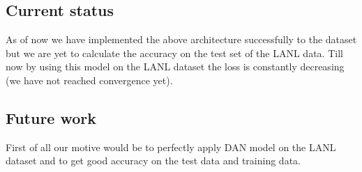 \subsection{Current status}
As of now we have implemented the above architecture successfully to the dataset but we are yet to calculate the accuracy on the test set of the LANL data. Till now by using this model on the LANL dataset the loss is constantly decreasing (we have not reached convergence yet).


\subsection{Future work}
First of all our motive would be to perfectly apply DAN model on the LANL dataset and to get good accuracy on the test data and training data.
